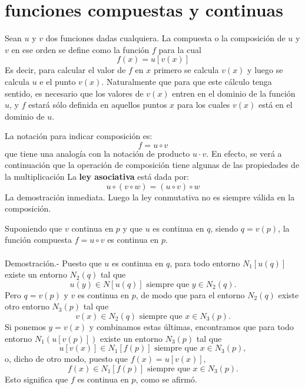 \section{funciones compuestas y continuas}

\begin{tcolorbox}
    \begin{def.}
	Sean $u$ y $v$ dos funciones dadas cualquiera. La compuesta o la composición de $u$ y $v$ en ese orden se define como la función $f$ para la cual
	$$f(x)=u[v(x)]$$
	Es decir, para calcular el valor de $f$ en $x$ primero se calcula $v(x)$ y luego se calcula $u$ e el punto $v(x)$. Naturalmente que para que este cálculo tenga sentido, es necesario que los valores de $v(x)$ entren en el dominio de la función $u$, y $f$ estará sólo definida en aquellos puntos $x$ para los cuales $v(x)$ está en el dominio de $u$.
    \end{def.}
\end{tcolorbox}

La notación para indicar composición es: 
$$f=u\circ v$$
que tiene una analogía con la notación de producto $u\cdot v$. En efecto, se verá a continuación que la operación de composición tiene algunas de las propiedades de la multiplicación
La \textbf{ley asociativa} está dada por:
$$u\circ(v\circ w) = (u\circ v)\circ w$$
La demostración  inmediata. Luego la ley conmutativa no es siempre válida en la composición.\\

\begin{teo}
    Suponiendo que $v$ continua en $p$ y que $u$ es continua en $q$, siendo $q=v(p)$, la función compuesta $f=u\circ v$ es continua en $p$.\\\\
	Demostración.-\; Puesto que $u$ es continua en $q$, para todo entorno $N_1[u(q)]$ existe un entorno $N_2(q)$ tal que 
	$$u(y)\in N[u(q)]\mbox{ siempre que } y \in N_2(q).$$
	Pero $q=v(p)$ y $v$ es continua en $p$, de modo que para el entorno $N_2(q)$ existe otro entorno $N_3(p)$ tal que 
	$$v(x)\in N_2(q)\mbox{ siempre que } x\in N_3(p).$$
	Si ponemos $y=v(x)$ y combinamos estas últimas, encontramos que para todo entorno $N_1(u[v(p)])$ existe un entorno $N_3(p)$ tal que 
	$$u[v(x)]\in N_1[f(p)]\mbox{ siempre que } x\in N_3(p),$$
	o, dicho de otro modo, puesto que $f(x)=u[v(x)],$
	$$f(x)\in N_1[f(p)]\mbox{ siempre que } x\in N_3(p).$$
	Esto significa que $f$ es continua en $p$, como se afirmó.\\\\

\end{teo}

